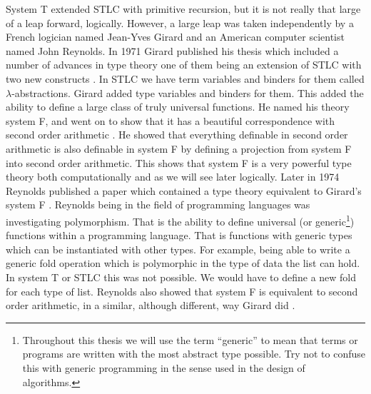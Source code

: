 System T extended STLC with primitive recursion, but it is not really
that large of a leap forward, logically.  However, a large leap was
taken independently by a French logician named Jean-Yves Girard and an
American computer scientist named John Reynolds.  In 1971 Girard
published his thesis which included a number of advances in type
theory one of them being an extension of STLC with two new constructs
\cite{Girard:1971,Girard:1989,Barendregt:1992}.  In STLC we have term
variables and binders for them called $\lambda$-abstractions.  Girard
added type variables and binders for them.  This added the ability to
define a large class of truly universal functions. He named his theory
system F, and went on to show that it has a beautiful correspondence
with second order arithmetic \cite{Wadler:2007}.  He showed that
everything definable in second order arithmetic is also definable in
system F by defining a projection from system F into second order
arithmetic.  This shows that system F is a very powerful type theory
both computationally and as we will see later logically.  Later in
1974 Reynolds published a paper which contained a type theory
equivalent to Girard's system F \cite{Reynolds:1974,Reynolds:1998}.
Reynolds being in the field of programming languages was investigating
polymorphism.  That is the ability to define universal (or
generic\footnote{ Throughout this thesis we will use the term
  ``generic'' to mean that terms or programs are written with the most
  abstract type possible.  Try not to confuse this with generic
  programming in the sense used in the design of algorithms.})
functions within a programming language.  That is functions with
generic types which can be instantiated with other types. For example,
being able to write a generic fold operation which is polymorphic in
the type of data the list can hold.  In system T or STLC this was not
possible.  We would have to define a new fold for each type of list.
Reynolds also showed that system F is equivalent to second order
arithmetic, in a similar, although different, way Girard did
\cite{Wadler:2007}.


